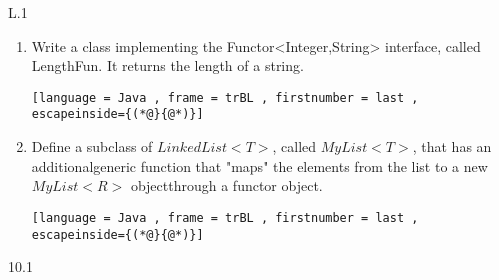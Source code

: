L.1
\begin{enumerate}[label=(\alph*),align=left, wide, labelwidth=!, labelindent=0pt]

\item Write a class implementing the Functor<Integer,String> interface, called LengthFun.  It returns the length of a string.


\begin{lstlisting}[language = Java , frame = trBL , firstnumber = last , escapeinside={(*@}{@*)}]

\end{lstlisting}  		

\item Define a subclass of $LinkedList<T>$, called $MyList<T>$, that has an additionalgeneric function that "maps" the elements from the list to a new $MyList<R>$ objectthrough a functor object.

\begin{lstlisting}[language = Java , frame = trBL , firstnumber = last , escapeinside={(*@}{@*)}]

\end{lstlisting}  		

\end{enumerate}
 
10.1

\noindent

